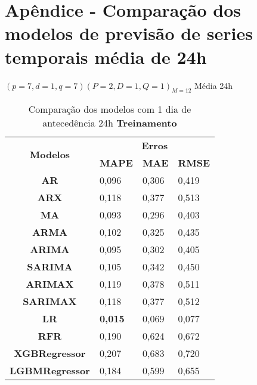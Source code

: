 
\section{Ap\^endice - Compara\c c\~ao dos modelos de previs\~ao de series temporais m\'edia de 24h}\label{sec:comtb24}



$(p = 7,d = 1,q = 7) (P = 2,D = 1,Q = 1)_{M = 12}$ Média 24h
	\begin{table}[H]
	\centering
	\caption{Comparação dos modelos com 1 dia de antecedência 24h \textbf{Treinamento} }\label{tb:1-24trn}
	\begin{tabular}{@{}clll@{}}
		\toprule
		\multirow{2}{*}{\textbf{Modelos}} & \multicolumn{3}{c}{\textbf{Erros}}                                                                       \\ \cmidrule(l){2-4} 
		& \multicolumn{1}{c}{\textbf{MAPE}} & \multicolumn{1}{c}{\textbf{MAE}} & \multicolumn{1}{c}{\textbf{RMSE}} \\ \hline
\textbf{AR}                       & 0,096                             & 0,306                            & 0,419                             \\
\textbf{ARX}                      & 0,118                             & 0,377                            & 0,513                             \\
\textbf{MA}                       & 0,093                             & 0,296                            & 0,403                             \\
\textbf{ARMA}                     & 0,102                             & 0,325                            & 0,435                             \\
\textbf{ARIMA}                    & 0,095                             & 0,302                            & 0,405                             \\
\textbf{SARIMA}                   & 0,105                             & 0,342                            & 0,450                             \\
\textbf{ARIMAX}                   & 0,119                             & 0,378                            & 0,511                             \\
\textbf{SARIMAX}                  & 0,118                             & 0,377                            & 0,512                             \\
\textbf{LR}                       & \textbf{0,015}                             & 0,069                            & 0,077                             \\
\textbf{RFR}                      & 0,190                             & 0,624                            & 0,672                             \\
\textbf{XGBRegressor}             & 0,207                             & 0,683                            & 0,720                             \\
\textbf{LGBMRegressor}            & 0,184                             & 0,599                            & 0,655                             \\ \bottomrule
	\end{tabular}


\end{table}
